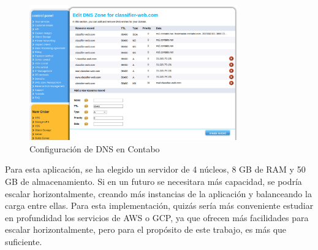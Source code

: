 \begin{figure}[H]
    \centering
    \includegraphics[width=0.8\textwidth]{cap3/images/contabo-dns.png}
    \caption{Configuración de DNS en Contabo}
    \label{fig:contabo-dns}
\end{figure}

Para esta aplicación, se ha elegido un servidor de 4 núcleos, 8 GB de RAM y 50 GB de almacenamiento.
Si en un futuro se necesitara más capacidad, se podría escalar horizontalmente, creando más instancias de la aplicación y balanceando la carga entre ellas.
Para esta implementación, quizás sería más conveniente estudiar en profundidad los servicios de AWS o GCP, ya que ofrecen más facilidades para escalar horizontalmente, pero para el propósito de este trabajo, es más que suficiente.





\endinput